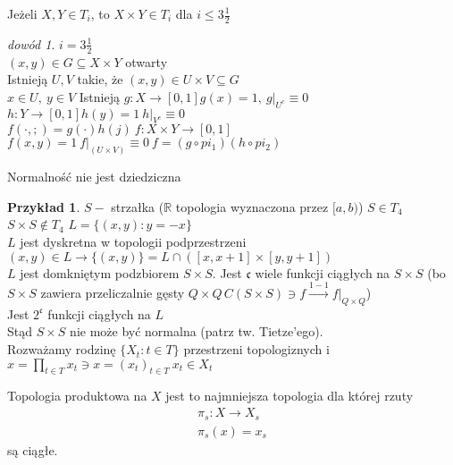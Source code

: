 \documentclass[twoside,10pt]{article}
\theoremstyle{definition}
\theoremstyle{definition}
\theoremstyle{definition}
\theoremstyle{definition}
\theoremstyle{remark}
\newtheorem*{dd}{dowód}
\theoremstyle{definition}
\theoremstyle{definition}
\theoremstyle{definition}
\theoremstyle{definition}
\newtheorem*{prz}{Przykład}
\theoremstyle{definition}
\theoremstyle{definition}
\begin{document}
\begin{tw} Jeżeli $X,Y \in T_i$, to $X \times Y \in T_i$ dla $i \le 3\frac{1}{2}$ \end{tw} 
\begin{dd} $i = 3\frac{1}{2}$ \\ 
    $(x,y) \in G \subseteq X \times Y$ otwarty \\ 
    Istnieją $U,V$ takie, że $(x,y) \in U \times V \subseteq G$ \\ 
    $x \in U,\ y \in V$ Istnieją $g: X \to [0,1] g(x) = 1,\ g|_{U^c} \equiv 0$ \\ 
    $h: Y \to [0,1] h(y) = 1 \ h|_{V^c} \equiv 0$ \\ 
    $f(\cdot,;) = g(\cdot)h(j) \ f: X \times Y \to [0,1]$ \\ 
    $f(x,y) = 1 \ f|_{(U \times V)} \equiv 0 \ f = (g \circ pi_1)(h \circ pi_2)$
\end{dd} 
\begin{ft} 
    Normalność nie jest dziedziczna
\end{ft} 
\begin{prz} 
    $S - $ strzałka ($\mathbb R$ topologia wyznaczona przez $[a,b)$)
    $S \in T_4$ \\ 
    $S \times S \notin T_4$
    $L = \{ (x,y): y = -x \}$ \\ 
    $L$ jest dyskretna w topologii podprzestrzeni $(x,y) \in L \to \{(x,y)\} = 
    L \cap ([x,x+1] \times [y,y+1])$ \\ 
    $L$ jest domkniętym podzbiorem $S \times S$. 
    Jest $\mathfrak{c}$ wiele funkcji ciągłych na $S \times S$ (bo $S \times S$ zawiera
    przeliczalnie gęsty $Q\times Q\, C(S \times S) \ni f\xrightarrow{1-1} f|_{Q\times Q}$)
    \\Jest $2^{\mathfrak{c}}$ funkcji ciągłych na $L$ \\ 
    Stąd $S \times S$ nie może być normalna (patrz tw. Tietze'ego).\\[1cm] 
    Rozważamy rodzinę $\{X_t : t \in T\}$ przestrzeni topologiznych i $x = \prod\limits
    _{t \in T} x_t \ni x = (x_t)_{t \in T} \ x_t \in X_t$ 
\end{prz} 
\begin{df} 
    Topologia produktowa na $X$ jest to najmniejsza topologia dla której rzuty 
    \begin{gather} 
        \pi_s : X \to X_s \\ 
        \pi_s (x) = x_s 
    \end{gather} są ciągłe.
\end{df} 
\end{document}
